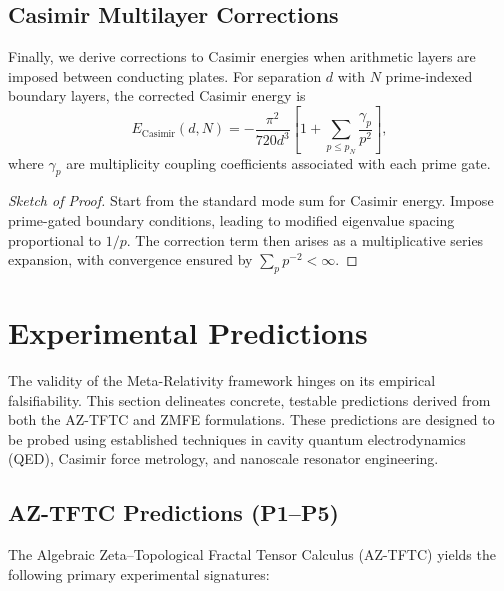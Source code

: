 \documentclass[12]{amsart}
\theoremstyle{plain}
\begin{document}
\subsection{Casimir Multilayer Corrections}

Finally, we derive corrections to Casimir energies when arithmetic layers are imposed between conducting plates. For separation $d$ with $N$ prime-indexed boundary layers, the corrected Casimir energy is
\begin{equation}
    E_{\mathrm{Casimir}}(d,N) = - \frac{\pi^2}{720 d^3} \left[ 1 + \sum_{p \leq p_N} \frac{\gamma_p}{p^2} \right] ,
\end{equation}
where $\gamma_p$ are multiplicity coupling coefficients associated with each prime gate.  

\begin{proof}[Sketch of Proof]
Start from the standard mode sum for Casimir energy. Impose prime-gated boundary conditions, leading to modified eigenvalue spacing proportional to $1/p$. The correction term then arises as a multiplicative series expansion, with convergence ensured by $\sum_p p^{-2} < \infty$.
\end{proof}

\section{Experimental Predictions}

The validity of the Meta-Relativity framework hinges on its empirical falsifiability. This section delineates concrete, testable predictions derived from both the AZ-TFTC and ZMFE formulations. These predictions are designed to be probed using established techniques in cavity quantum electrodynamics (QED), Casimir force metrology, and nanoscale resonator engineering.

\subsection{AZ-TFTC Predictions (P1--P5)}

The Algebraic Zeta–Topological Fractal Tensor Calculus (AZ-TFTC) yields the following primary experimental signatures:
\end{document}
